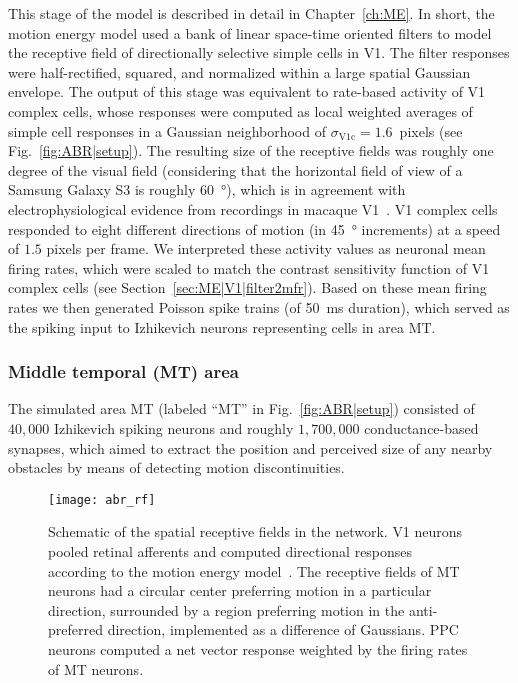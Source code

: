 This stage of the model is described in detail in 
Chapter~\ref{ch:ME}.
In short, the motion energy model used a bank of 
linear space-time oriented filters to model the 
receptive field of directionally selective simple cells in \ac{V1}.
The filter responses were half-rectified, squared, and normalized
within a large spatial Gaussian envelope. The output of this stage
was equivalent to rate-based activity of \ac{V1} complex cells, whose
responses were computed as local weighted averages of simple cell
responses in a Gaussian neighborhood of 
$\sigma_{\textrm{V1c}} = 1.6$~pixels (see Fig.~\ref{fig:ABR|setup}).
The resulting size of the receptive fields was roughly one
degree of the visual field (considering that the horizontal field of
view of a Samsung Galaxy S3 is roughly \SI{60}{\degree}), 
which is in agreement
with electrophysiological evidence from recordings in macaque
\ac{V1}~\citep{FreemanSimoncelli2011}. 
\ac{V1} complex cells responded
to eight different directions of motion (in 
\SI{45}{\degree} increments) at
a speed of $1.5$ pixels per frame. 
We interpreted these activity
values as neuronal mean firing rates, which were scaled to match
the contrast sensitivity function of \ac{V1} complex cells
(see Section~\ref{sec:ME|V1|filter2mfr}).
Based on these mean firing rates we then generated
Poisson spike trains (of \SI{50}{\milli\second} duration), 
which served as the
spiking input to Izhikevich neurons representing cells in 
area \ac{MT}.


\subsubsection{Middle temporal (MT) area}
\label{sec:ABR|model|MT}
The simulated area \ac{MT} (labeled ``MT'' in 
Fig.~\ref{fig:ABR|setup}) consisted
of $40,000$ Izhikevich spiking neurons and roughly $1,700,000$
conductance-based synapses, which aimed to extract the position
and perceived size of any nearby obstacles by means of detecting
motion discontinuities.

\begin{figure}[t]
  \centering
  \texttt{[image: abr\_rf]}
  \caption{
  Schematic of the spatial receptive fields in the network.
  \ac{V1} neurons pooled retinal afferents and computed
  directional responses according to the motion energy
  model~\citep{SimoncelliHeeger1998}.
  The receptive fields of \ac{MT} neurons had a circular center
  preferring motion in a particular direction, surrounded by
  a region preferring motion in the anti-preferred direction,
  implemented as a difference of Gaussians.
  \ac{PPC} neurons computed a net vector response weighted by the
  firing rates of \ac{MT} neurons.}
  \label{fig:ABR|RF}
\end{figure}

